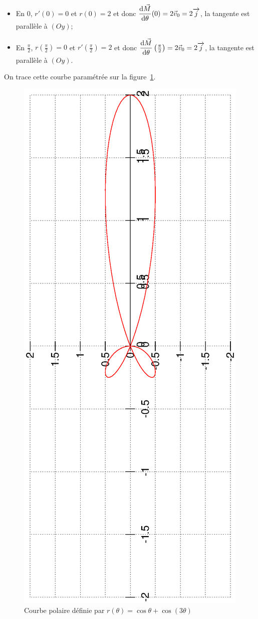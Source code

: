 \begin{itemize}
\item En $0$, $r'(0)=0$ et $r(0)=2$ et donc $\dfrac{\mathrm{d} \vec{M}}{\mathrm{d} \theta}(0)=2 \vec{v}_0=2 \overrightarrow{j}$, la tangente est parallèle à $(Oy)$;
\item En $\frac{\pi}{2}$, $r\left(\frac{\pi}{2}\right)=0$ et $r'\left(\frac{\pi}{2}\right)=2$ et donc $\dfrac{\mathrm{d} \vec{M}}{\mathrm{d} \theta}\left(\frac{\pi}{2}\right)=2 \vec{v}_0=2 \overrightarrow{j}$, la tangente est parallèle à $(Oy)$.
\end{itemize}
On trace cette courbe paramétrée sur la figure~\ref{fig:pol}.
\begin{figure}
 \centering
 \includegraphics[angle=-90,width=\textwidth,scale=1]{courbepolaire.ps}
 \caption{Courbe polaire définie par $r(\theta)=\cos\theta+\cos(3\theta)$}
 \label{fig:pol}
\end{figure}
